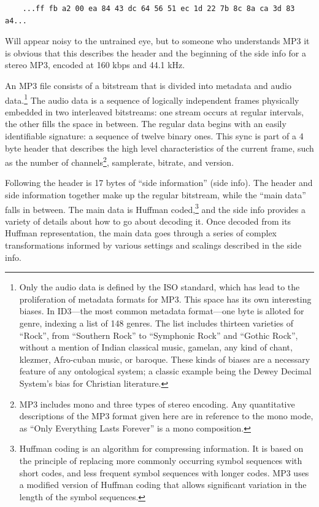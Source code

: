 \documentclass{thesis}
\begin{document}
	\begin{verbatim}
	...ff fb a2 00 ea 84 43 dc 64 56 51 ec 1d 22 7b 8c 8a ca 3d 83 a4...
	\end{verbatim}
	
Will appear noisy to the untrained eye, but to someone who understands MP3 it is obvious that this describes the header and the beginning of the side info for a stereo MP3, encoded at 160 kbps and 44.1 kHz.

An MP3 file consists of a bitstream that is divided into metadata and audio data.\footnote{Only the audio data is defined by the ISO standard, which has lead to the proliferation of metadata formats for MP3. This space has its own interesting biases. In ID3---the most common metadata format---one byte is alloted for genre, indexing a list of 148 genres. The list includes thirteen varieties of ``Rock'', from ``Southern Rock'' to ``Symphonic Rock'' and ``Gothic Rock'', without a mention of Indian classical music, gamelan, any kind of chant, klezmer, Afro-cuban music, or baroque. These kinds of biases are a necessary feature of any ontological system; a classic example being the Dewey Decimal System's bias for Christian literature.} The audio data is a sequence of logically independent frames physically embedded in two interleaved bitstreams: one stream occurs at regular intervals, the other fills the space in between. The regular data begins with an easily identifiable signature: a sequence of twelve binary ones. This sync is part of a 4 byte header that describes the high level characteristics of the current frame, such as the number of channels\footnote{MP3 includes mono and three types of stereo encoding. Any quantitative descriptions of the MP3 format given here are in reference to the mono mode, as ``Only Everything Lasts Forever'' is a mono composition.}, samplerate, bitrate, and version.
	
Following the header is 17 bytes of ``side information'' (side info). The header and side information together make up the regular bitstream, while the ``main data'' falls in between. The main data is Huffman coded,\footnote{Huffman coding is an algorithm for compressing information. It is based on the principle of replacing more commonly occurring symbol sequences with short codes, and less frequent symbol sequences with longer codes. MP3 uses a modified version of Huffman coding that allows significant variation in the length of the symbol sequences.} and the side info provides a variety of details about how to go about decoding it. Once decoded from its Huffman representation, the main data goes through a series of complex transformations informed by various settings and scalings described in the side info.
\end{document}
